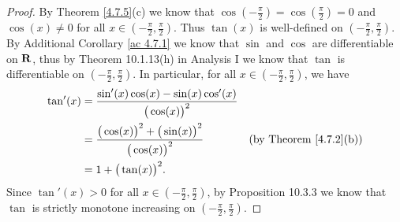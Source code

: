\begin{proof}
    By Theorem \ref{4.7.5}(c) we know that \(\cos(-\frac{\pi}{2}) = \cos(\frac{\pi}{2}) = 0\) and \(\cos(x) \neq 0\) for all \(x \in (-\frac{\pi}{2}, \frac{\pi}{2})\).
    Thus \(\tan(x)\) is well-defined on \((-\frac{\pi}{2}, \frac{\pi}{2})\).
    By Additional Corollary \ref{ac 4.7.1} we know that \(\sin\) and \(\cos\) are differentiable on \(\mathbf{R}\), thus by Theorem 10.1.13(h) in Analysis I we know that \(\tan\) is differentiable on \((-\frac{\pi}{2}, \frac{\pi}{2})\).
    In particular, for all \(x \in (-\frac{\pi}{2}, \frac{\pi}{2})\), we have
    \begin{align*}
        \tan'(x) & = \frac{\sin'(x) \cos(x) - \sin(x) \cos'(x)}{\big(\cos(x)\big)^2}                                            \\
                 & = \frac{\big(\cos(x)\big)^2 + \big(\sin(x)\big)^2}{\big(\cos(x)\big)^2} & \text{(by Theorem \ref{4.7.2}(b))} \\
                 & = 1 + \big(\tan(x)\big)^2.
    \end{align*}
    Since \(\tan'(x) > 0\) for all \(x \in (-\frac{\pi}{2}, \frac{\pi}{2})\), by Proposition 10.3.3 we know that \(\tan\) is strictly monotone increasing on \((-\frac{\pi}{2}, \frac{\pi}{2})\).


\end{proof}
